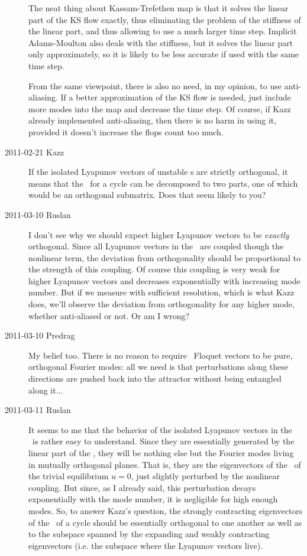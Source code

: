 \begin{description}
  The neat thing about Kassam-Trefethen map is that it solves the linear
  part of the KS flow exactly, thus eliminating the problem of the
  stiffness of the linear part, and thus allowing to use a much larger time
  step.  Implicit Adams-Moulton also deals with the stiffness, but it
  solves the linear part only approximately, so it is likely to be less
  accurate if used with the same time step.

  From the same viewpoint, there is also no need, in my opinion, to use
  anti-aliasing.  If a better approximation of the KS flow is needed, just
  include more modes into the map and decrease the time step.  Of course,
  if Kazz already implemented anti-aliasing, then there is no harm in using
  it, provided it doesn't increase the flops count too much.

\item[2011-02-21 Kazz]
  If the isolated Lyapunov vectors of
  {unstable \po}s are strictly orthogonal, it means that the \jacobianM\ for a
  cycle can be decomposed to two parts, one of which would be an
  orthogonal submatrix. Does that seem likely to you?

\item[2011-03-10 Ruslan]
  I don't see why we should expect higher Lyapunov vectors to be {\em
    exactly} orthogonal.  Since all Lyapunov vectors in the \KSe\ are coupled
  though the nonlinear term, the deviation from orthogonality should be
  proportional to the strength of this coupling.  Of course this coupling
  is very weak for higher Lyapunov vectors and decreases exponentially with
  increasing mode number.  But if we measure with sufficient resolution,
  which is what Kazz does, we'll observe the deviation from orthogonality
  for any higher mode, whether anti-aliased or not.  Or am I wrong?

\item[2011-03-10 Predrag] My belief too. There is no reason to require
  \transient\ Floquet vectors to be pure, orthogonal Fourier modes: all we
  need is that perturbations along these directions are pushed back into
  the attractor without being entangled along it...

\item[2011-03-11 Ruslan] It seems to me that the behavior of the isolated
  Lyapunov vectors in the \KSe\ is rather easy to understand.  Since they
  are essentially generated by the linear part of the \KSe, they will be
  nothing else but the Fourier modes living in mutually orthogonal planes.
  That is, they are the eigenvectors of the \jacobianM\ of the trivial
  equilibrium $u = 0$, just slightly perturbed by the nonlinear coupling.
  But since, as I already said, this perturbation decays exponentially with
  the mode number, it is negligible for high enough modes.  So, to answer
  Kazz's question, the strongly contracting eigenvectors of the \jacobianM\
  of a cycle should be essentially orthogonal to one another as well as to
  the subspace spanned by the expanding and weakly contracting eigenvectors
  (i.e. the subspace where the {\entangled} Lyapunov vectors live).


\end{description}
